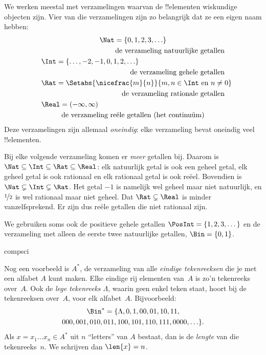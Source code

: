 \documentclass[openany]{memoir}
\begin{document}
\begin{ex}
We werken meestal met verzamelingen waarvan de !!{element}en wiskundige
objecten zijn. Vier van die verzamelingen zijn zo belangrijk dat ze een eigen
naam hebben:
\begin{multline*}
    \Nat = \{0, 1, 2, 3, \ldots\} \\
    \shoveright{\text{de verzameling natuurlijke getallen}}\\
    \shoveleft{\Int = \{\ldots, -2, -1, 0, 1, 2, \ldots\}} \\
    \shoveright{\text{de verzameling gehele getallen}}\\
    \shoveleft{\Rat = \Setabs{\nicefrac{m}{n}}{m, n \in \Int\text{ en }n \neq 0}}\\
    \shoveright{\text{de verzameling rationale getallen}}\\
    \shoveleft{\Real = (-\infty, \infty)}\\
    \text{de verzameling reële getallen (het continuüm)}
\end{multline*}
Deze verzamelingen zijn allemaal \emph{oneindig}: elke verzameling bevat
oneindig veel !!{element}en.

Bij elke volgende verzameling komen er \emph{meer} getallen bij. Daarom is
$\Nat \subseteq \Int \subseteq \Rat \subseteq \Real$: elk natuurlijk
getal is ook een geheel getal, elk geheel getal is ook rationaal en elk
rationaal getal is ook reëel. Bovendien is $\Nat \subsetneq \Int
\subsetneq \Rat$. Het getal $-1$ is namelijk wel geheel maar niet natuurlijk,
en $\nicefrac{1}{2}$ is wel rationaal maar niet geheel. Dat $\Rat
\subsetneq \Real$ is minder vanzelfsprekend. Er zijn dus reële getallen die
niet rationaal zijn.

We gebruiken soms ook de positieve gehele getallen $\PosInt = \{1,
2, 3, \dots\}$ en de verzameling met alleen de eerste twee natuurlijke
getallen, $\Bin = \{0, 1\}$.
\end{ex}

\begin{tagblock}{compsci}
\begin{ex}[Tekenreeksen]
Nog een voorbeeld is $A^{*}$, de verzameling van alle \emph{eindige
tekenreeksen} die je met een alfabet $A$ kunt maken. Elke eindige rij
elementen van~$A$ is zo'n tekenreeks over~$A$. Ook de
\emph{lege tekenreeks $\Lambda$},
waarin geen enkel teken staat, hoort bij de tekenreeksen over~$A$, voor elk
alfabet~$A$. Bijvoorbeeld:
\begin{multline*}
\Bin^*
=\{\Lambda,0,1,00,01,10,11,\\
000,001,010,011,100,101,110,111,0000,\ldots\}.
\end{multline*}
Als $x=x_{1}\ldots x_{n}\in A^{*}$ uit $n$ ``letters'' van $A$ bestaat,
dan is de \emph{lengte} van die tekenreeks~$n$. We schrijven dan
$\len{x}=n$.
\end{ex}
\end{tagblock}
\end{document}
